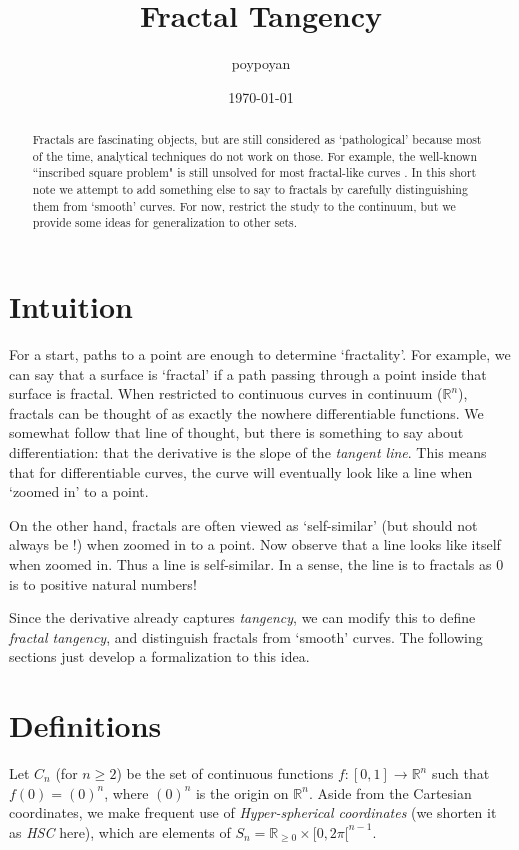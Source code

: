\documentclass{article}
\title{Fractal Tangency}
\author{poypoyan}
\date{\petsa\today}
\theoremstyle{plain}
\begin{document}
\maketitle

\begin{abstract}
Fractals are fascinating objects, but are still considered as `pathological' because most of the time, analytical techniques do not work on those. For example, the well-known ``inscribed square problem" is still unsolved for most fractal-like curves \cite{square}. In this short note we attempt to add something else to say to fractals by carefully distinguishing them from `smooth' curves. For now, restrict the study to the continuum, but we provide some ideas for generalization to other sets.
\end{abstract}

\section{Intuition}
For a start, paths to a point are enough to determine `fractality'. For example, we can say that a surface is `fractal' if a path passing through a point inside that surface is fractal. When restricted to continuous curves in continuum ($\mathbb{R}^n$), fractals can be thought of as exactly the nowhere differentiable functions. We somewhat follow that line of thought, but there is something to say about differentiation: that the derivative is the slope of the \textit{tangent line}. This means that for differentiable curves, the curve will eventually look like a line when `zoomed in' to a point.

On the other hand, fractals are often viewed as `self-similar' (but should not always be \cite{3b1b}!) when zoomed in to a point. Now observe that a line looks like itself when zoomed in. Thus a line is self-similar. In a sense, the line is to fractals as 0 is to positive natural numbers!

Since the derivative already captures \textit{tangency}, we can modify this to define \textit{fractal tangency}, and distinguish fractals from `smooth' curves. The following sections just develop a formalization to this idea.

\section{Definitions}
Let $C_n$ (for $n \ge 2$) be the set of continuous functions $f:[0,1]\rightarrow\mathbb{R}^n$ such that $f(0)=(0)^n$, where $(0)^n$ is the origin on $\mathbb{R}^n$. Aside from the Cartesian coordinates, we make frequent use of \textit{Hyper-spherical coordinates} (we shorten it as \textit{HSC} here), which are elements of $S_n = \mathbb{R}_{\ge 0} \times [0, 2\pi[^{n-1}$.
\end{document}
